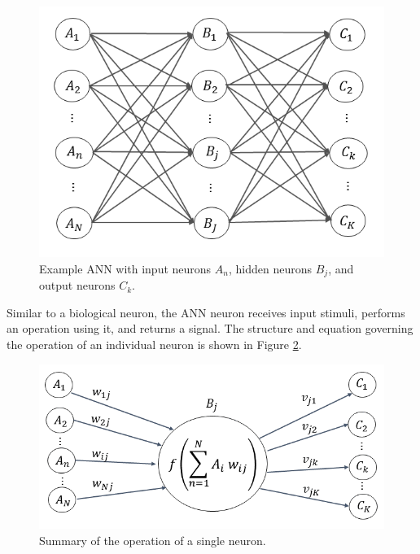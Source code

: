\begin{figure}[H]
\centering
\includegraphics[width=0.75\linewidth]{images/Network}
\caption{Example ANN with input neurons $A_n$, hidden neurons $B_j$, and output neurons $C_k$.}
\label{fig:Network}
\end{figure}


Similar to a biological neuron, the ANN neuron receives input stimuli, performs an operation using it, and returns a signal. The structure and equation governing the operation of an individual neuron is shown in Figure \ref{fig:Node}. 

\begin{figure}[H]
	\centering
	\includegraphics[width=0.75\linewidth]{images/Node_ABC_2}
	\caption{Summary of the operation of a single neuron.}
	\label{fig:Node}
\end{figure}

